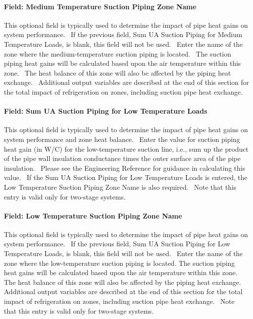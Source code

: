 \paragraph{Field: Medium Temperature Suction Piping Zone Name}\label{field-medium-temperature-suction-piping-zone-name}

This optional field is typically used to determine the impact of pipe heat gains on system performance.~ If the previous field, Sum UA Suction Piping for Medium Temperature Loads, is blank, this field will not be used.~ Enter the name of the zone where the medium-temperature suction piping is located.~ The suction piping heat gains will be calculated based upon the air temperature within this zone.~ The heat balance of this zone will also be affected by the piping heat exchange.~ Additional output variables are described at the end of this section for the total impact of refrigeration on zones, including suction pipe heat exchange.

\paragraph{Field: Sum UA Suction Piping for Low Temperature Loads}\label{field-sum-ua-suction-piping-for-low-temperature-loads}

This optional field is typically used to determine the impact of pipe heat gains on system performance and zone heat balance.~ Enter the value for suction piping heat gain (in W/C) for the low-temperature suction line, i.e., sum up the product of the pipe wall insulation conductance times the outer surface area of the pipe insulation.~ Please see the Engineering Reference for guidance in calculating this value.~ If the Sum UA Suction Piping for Low Temperature Loads is entered, the Low Temperature Suction Piping Zone Name is also required.~ Note that this entry is valid only for two-stage systems.

\paragraph{Field: Low Temperature Suction Piping Zone Name}\label{field-low-temperature-suction-piping-zone-name}

This optional field is typically used to determine the impact of pipe heat gains on system performance.~ If the previous field, Sum UA Suction Piping for Low Temperature Loads, is blank, this field will not be used.~ Enter the name of the zone where the low-temperature suction piping is located. The suction piping heat gains will be calculated based upon the air temperature within this zone.~ The heat balance of this zone will also be affected by the piping heat exchange.~ Additional output variables are described at the end of this section for the total impact of refrigeration on zones, including suction pipe heat exchange.~ Note that this entry is valid only for two-stage systems.

